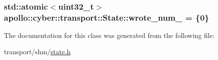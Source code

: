 \hypertarget{classapollo_1_1cyber_1_1transport_1_1State_a425b6f789a569327d2f09ee895c748cd}{
\subsubsection[{wrote\-\_\-num\-\_\-}]{\setlength{\rightskip}{0pt plus 5cm}std\-::atomic$<$uint32\-\_\-t$>$ apollo\-::cyber\-::transport\-::\-State\-::wrote\-\_\-num\-\_\- = \{0\}\hspace{0.3cm}{\ttfamily [private]}}}\label{classapollo_1_1cyber_1_1transport_1_1State_a425b6f789a569327d2f09ee895c748cd}


The documentation for this class was generated from the following file\-:\begin{DoxyCompactItemize}
\item 
transport/shm/\hyperlink{transport_2shm_2state_8h}{state.\-h}\end{DoxyCompactItemize}
